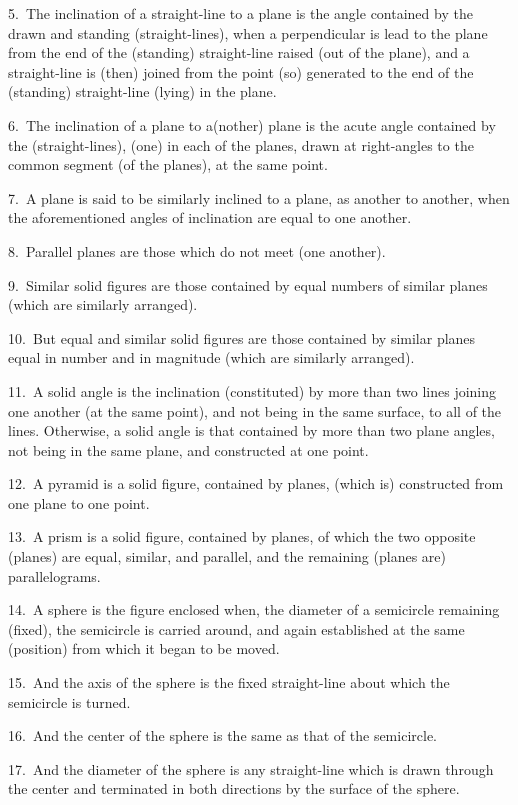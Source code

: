 \begin{Parallel}{}{}
{5.~The inclination of a straight-line to a plane is the angle contained
by the drawn and standing (straight-lines), when a perpendicular is
lead  to the plane from the end of the (standing) straight-line raised (out of the plane), and a straight-line
is (then) joined from the point (so) generated to the end of the (standing) straight-line (lying) in the plane.

6.~The inclination of a plane to a(nother) plane is the  acute angle
contained by the (straight-lines), (one)  in each of the planes, drawn at right-angles to the common segment
(of the planes), at the same point.

7.~A plane is said to be similarly inclined to a plane,
as another  to  another, when the aforementioned angles
of inclination are equal to one another.

8.~Parallel planes are those which do not meet (one another).

9.~Similar solid figures are those contained by equal numbers of similar
planes (which are similarly arranged).

10.~But equal and similar solid figures are those contained
by similar planes equal in number and in magnitude (which are similarly arranged).

11.~A solid angle is the inclination (constituted) by more than two lines joining one another (at the same point), and
not being in the same surface, to all of the lines. Otherwise,
a solid angle is that contained by more than two plane angles, not being
in the same plane, and constructed at one point.

12.~A pyramid is a solid figure, contained by planes, (which is) constructed from one plane to
one  point.

13.~A prism is a solid figure, contained by planes, of which the two opposite
(planes)
are equal, similar, and parallel, and the remaining (planes are) parallelograms.

14.~A sphere is the figure enclosed when, the diameter of a semicircle remaining (fixed), the semicircle is carried around,
 and  again established at the same (position) from which it began to be moved.
 
15.~And the axis of the sphere is the fixed straight-line about
 which the semicircle is turned.
 
16.~And the center of the sphere is the same as that of the semicircle.

17.~And the diameter of the sphere is any straight-line which is
 drawn through the center and terminated in both directions by
 the surface of the sphere.
 
}
\end{Parallel}

